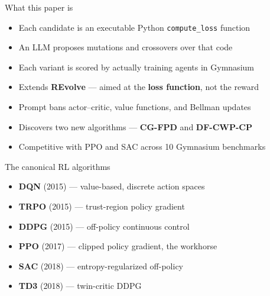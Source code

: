 \documentclass[10pt, aspectratio=169]{beamer}
\newcommand{\hilite}[1]{{\color{UofSCGarnet}\textbf{#1}}}
\begin{document}
\begin{frame}{What this paper is}
  \vspace{0.6em}
  \begin{itemize}\setlength\itemsep{0.5em}
    \item Each candidate is an executable Python \texttt{compute\_loss} function
    \item An LLM proposes mutations and crossovers over that code
    \item Each variant is scored by actually training agents in Gymnasium
    \item Extends \textbf{REvolve} --- aimed at the \hilite{loss function},
          not the reward
    \item Prompt bans actor--critic, value functions, and Bellman updates
    \item Discovers two new algorithms --- \textbf{CG-FPD} and \textbf{DF-CWP-CP}
    \item Competitive with PPO and SAC across 10 Gymnasium benchmarks
  \end{itemize}
\end{frame}

\begin{frame}{The canonical RL algorithms}
  \vspace{0.6em}
  \begin{itemize}\setlength\itemsep{0.4em}
    \item \textbf{DQN} (2015) --- value-based, discrete action spaces
    \item \textbf{TRPO} (2015) --- trust-region policy gradient
    \item \textbf{DDPG} (2015) --- off-policy continuous control
    \item \textbf{PPO} (2017) --- clipped policy gradient, the workhorse
    \item \textbf{SAC} (2018) --- entropy-regularized off-policy
    \item \textbf{TD3} (2018) --- twin-critic DDPG
  \end{itemize}
\end{frame}
\end{document}

